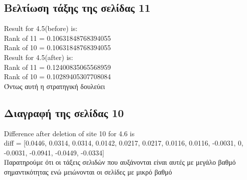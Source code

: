 \documentclass[a4paper,11pt]{article}
\newcommand{\lt}{\latintext}
\newcommand{\gt}{\greektext}
\begin{document}
	\subsection{Βελτίωση τάξης της σελίδας 11}
\normalsize{\lt
Result for 4.5(before) is:
\\ Rank of 11 = 0.10631848768394055
\\ Rank of 10 = 0.10631848768394055
\\ Result for 4.5(after) is:
\\ Rank of 11 = 0.12400835065568959
\\ Rank of 10 = 0.10289405307708084
\\ \gt Όντως αυτή η στρατηγική δουλεύει}	
	
	\subsection{Διαγραφή της σελίδας 10}
\normalsize{\lt 
Difference after deletion of site 10 for 4.6 is
\\ diff = [0.0446, 0.0314, 0.0314, 0.0142, 0.0217, 0.0217, 0.0116,
0.0116, -0.0031, 0, -0.0031, -0.0941, -0.0449, -0.0334]
\\ \gt Παρατηρούμε ότι οι τάξεις σελιδών που αυξάνονται είναι αυτές
με μεγάλο βαθμό σημαντικότητας ενώ μειώνονται οι σελίδες με μικρό
βαθμό}
\end{document}
